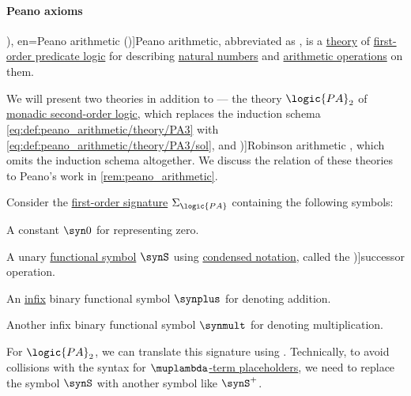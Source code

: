 \paragraph{Peano axioms}

\begin{definition}\label{def:peano_arithmetic}
  \term[ru=арифметика Пеано (\cite[167]{Герасимов2014Вычислимость}), en=Peano arithmetic (\cite[def. 4.1.1(ii)]{Hinman2005Logic})]{Peano arithmetic}, abbreviated as , is a \hyperref[def:fol_theory]{theory} of \hyperref[sec:first_order_logic]{first-order predicate logic} for describing \hyperref[def:natural_numbers]{natural numbers} and \hyperref[con:arithmetic/elementary]{arithmetic operations} on them.

  We will present two theories in addition to  --- the theory \( \logic{PA}_2 \) of \hyperref[def:second_order_logic]{monadic second-order logic}, which replaces the induction schema \eqref{eq:def:peano_arithmetic/theory/PA3} with \eqref{eq:def:peano_arithmetic/theory/PA3/sol}, and \term[en=Robinson arithmetic (\cite[def. 4.1.1(i)]{Hinman2005Logic})]{Robinson arithmetic} , which omits the induction schema altogether. We discuss the relation of these theories to Peano's work in \cref{rem:peano_arithmetic}.

  \begin{thmenum}
     Consider the \hyperref[def:fol_signature]{first-order signature} \( \Sigma_{\logic{PA}} \) containing the following symbols:
    \begin{thmenum}
       A constant \( \syn0 \) for representing zero.

       A unary \hyperref[def:fol_signature/function]{functional symbol} \( \synS \) using \hyperref[def:fol_signature/notation]{condensed notation}, called the \term[en=successor (\cite[87]{VanDalen2004LogicAndStructure})]{successor operation}.

       An \hyperref[def:fol_signature/notation]{infix} binary functional symbol \( \synplus \) for denoting addition.

       Another infix binary functional symbol \( \synmult \) for denoting multiplication.
    \end{thmenum}

    For \( \logic{PA}_2 \), we can translate this signature using . Technically, to avoid collisions with the syntax for \hyperref[def:lambda_term_schema]{\( \muplambda \)-term placeholders}, we need to replace the symbol \( \synS \) with another symbol like \( \synS^+ \).


\end{thmenum}
\end{definition}
